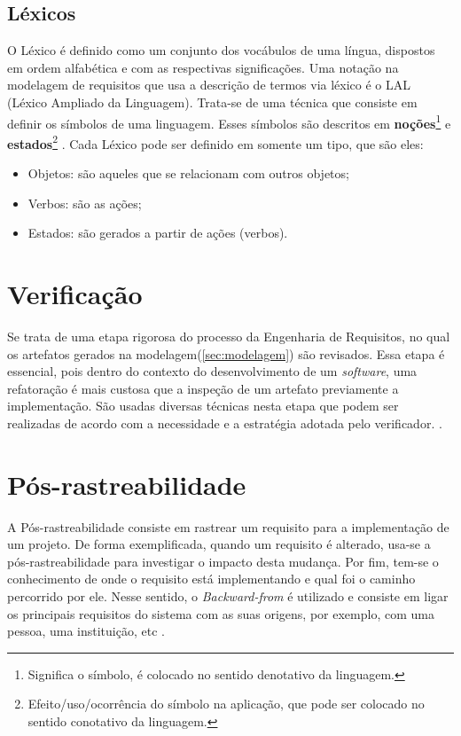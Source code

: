 \subsection{Léxicos}
O Léxico é definido como um conjunto dos vocábulos de uma língua, dispostos em ordem alfabética e com as respectivas significações. Uma notação na modelagem de requisitos que usa a descrição de termos via léxico é o LAL (Léxico Ampliado da Linguagem). Trata-se de uma técnica que consiste em definir os símbolos de uma linguagem. Esses símbolos são descritos em \textbf{noções}\footnote{Significa o símbolo, é colocado no sentido denotativo da linguagem.} e \textbf{estados}\footnote{Efeito/uso/ocorrência do símbolo na aplicação, que pode ser colocado no sentido conotativo da linguagem.} \cite{leite1993strategy}. Cada Léxico pode ser definido em somente um tipo, que são eles:

\begin{itemize}
    \item Objetos: são aqueles que se relacionam com outros objetos;
    \item Verbos: são as ações;
    \item Estados: são gerados a partir de ações (verbos).
\end{itemize}

\section {Verificação}

Se trata de uma etapa rigorosa do processo da Engenharia de Requisitos, no qual os artefatos gerados na modelagem(\ref{sec:modelagem}) são revisados. Essa etapa é essencial, pois dentro do contexto do desenvolvimento de um \textit{software}, uma refatoração é mais custosa que a inspeção de um artefato previamente a implementação. São usadas diversas técnicas nesta etapa que podem ser realizadas de acordo com a necessidade e a estratégia adotada pelo verificador. \cite{verification}.

\section {Pós-rastreabilidade}
A Pós-rastreabilidade consiste em rastrear um requisito para a implementação de um projeto. De forma exemplificada, quando um requisito é alterado, usa-se a pós-rastreabilidade para investigar o impacto desta mudança. Por fim, tem-se o conhecimento de onde o requisito está implementando e qual foi o caminho percorrido por ele. Nesse sentido, o \textit{Backward-from} é utilizado e consiste em ligar os principais requisitos do sistema com as suas origens, por exemplo, com uma pessoa, uma instituição, etc \cite{pinheiro2004requirements}.

